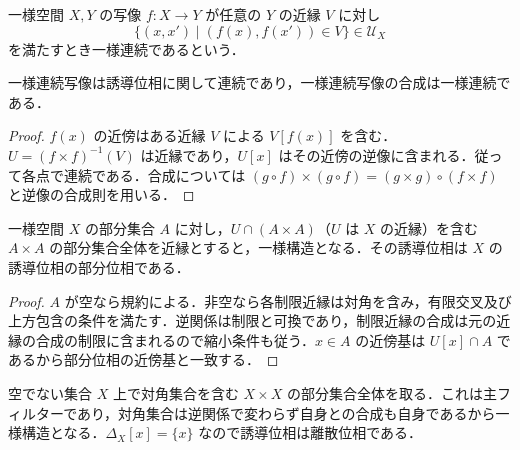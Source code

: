 \begin{defn}[一様連続写像]
一様空間 $X,Y$ の写像 $f:X\to Y$ が任意の $Y$ の近縁 $V$ に対し
\[
 \{(x,x')\mid(f(x),f(x'))\in V\}\in\mathcal U_X
\]
を満たすとき一様連続であるという．
\end{defn}
\begin{prop}[一様連続性と連続性]
一様連続写像は誘導位相に関して連続であり，一様連続写像の合成は一様連続である．
\end{prop}
\begin{proof}
$f(x)$ の近傍はある近縁 $V$ による $V[f(x)]$ を含む．$U=(f\times f)^{-1}(V)$ は近縁であり，$U[x]$ はその近傍の逆像に含まれる．従って各点で連続である．合成については $(g\circ f)\times(g\circ f)=(g\times g)\circ(f\times f)$ と逆像の合成則を用いる．
\end{proof}
\begin{prop}[部分一様空間]
一様空間 $X$ の部分集合 $A$ に対し，$U\cap(A\times A)$（$U$ は $X$ の近縁）を含む $A\times A$ の部分集合全体を近縁とすると，一様構造となる．その誘導位相は $X$ の誘導位相の部分位相である．
\end{prop}
\begin{proof}
$A$ が空なら規約による．非空なら各制限近縁は対角を含み，有限交叉及び上方包含の条件を満たす．逆関係は制限と可換であり，制限近縁の合成は元の近縁の合成の制限に含まれるので縮小条件も従う．$x\in A$ の近傍基は $U[x]\cap A$ であるから部分位相の近傍基と一致する．
\end{proof}
\begin{prop}[離散一様構造]
空でない集合 $X$ 上で対角集合を含む $X\times X$ の部分集合全体を取る．これは主フィルターであり，対角集合は逆関係で変わらず自身との合成も自身であるから一様構造となる．$\Delta_X[x]=\{x\}$ なので誘導位相は離散位相である．
\end{prop}
